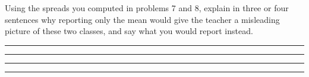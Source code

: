 \documentclass[12pt]{article}
\begin{document}
{\noindent Using the spreads you computed in problems 7 and 8, explain in three or four
sentences why reporting only the mean would give the teacher a misleading picture of these
two classes, and say what you would report instead.

\par\smallskip
\noindent\rule{\linewidth}{0.4pt}

\vspace{0.9cm}
\noindent\rule{\linewidth}{0.4pt}

\vspace{0.9cm}
\noindent\rule{\linewidth}{0.4pt}

\vspace{0.9cm}
\noindent\rule{\linewidth}{0.4pt}
\par\vspace*{0.3cm}
\noansline}
\end{document}
